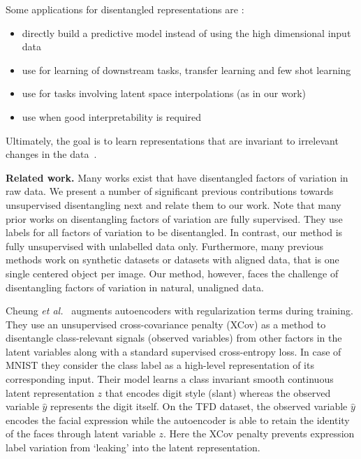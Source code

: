 \documentclass[12pt,a4paper]{article}
\begin{document}
Some applications for disentangled representations are \cite{ChallengeAssLofDisRepr}:
\begin{itemize}
  \item directly build a predictive model instead of using the high dimensional input data
  \item use for learning of downstream tasks, transfer learning and few shot learning
  \item use for tasks involving latent space interpolations (as in our work)
  \item use when good interpretability is required
\end{itemize}
Ultimately, the goal is to learn representations that are invariant to irrelevant changes in the data~\cite{FwkQuantEvalDisRep}.

\par \textbf{Related work.} Many works exist that have disentangled factors of variation in raw data. We present a number of significant previous contributions towards unsupervised disentangling next and relate them to our work. Note that many prior works on disentangling factors of variation are fully supervised. They use labels for all factors of variation to be disentangled. In contrast, our method is fully unsupervised with unlabelled data only. Furthermore, many previous methods work on synthetic datasets or datasets with aligned data, that is one single centered object per image. Our method, however, faces the challenge of disentangling factors of variation in natural, unaligned data.


\par Cheung \textit{et al.}~\cite{DiscHiddenFoViDN} augments autoencoders with regularization terms during training. They use an unsupervised cross-covariance penalty (XCov) as a method to disentangle class-relevant signals (observed variables) from other factors in the latent variables along with a standard supervised cross-entropy loss. In case of MNIST they consider the class label as a high-level representation of its corresponding input. Their model learns a class invariant smooth continuous latent representation $z$ that encodes digit style (slant) whereas the observed variable $\hat{y}$ represents the digit itself. On the TFD dataset, the observed variable $\hat{y}$ encodes the facial expression while the autoencoder is able to retain the identity of the faces through latent variable $z$. Here the XCov penalty prevents expression label variation from ‘leaking’ into the latent representation.
\end{document}
